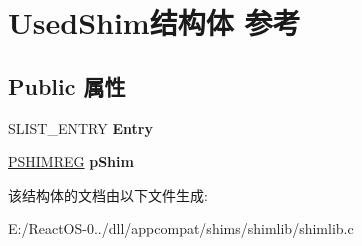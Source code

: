 \hypertarget{struct_used_shim}{}\section{Used\+Shim结构体 参考}
\label{struct_used_shim}
\subsection*{Public 属性}
\begin{DoxyCompactItemize}
\item 
\mbox{\label{struct_used_shim_a218ec9012872b8647698716df26bdc23}} 
S\+L\+I\+S\+T\+\_\+\+E\+N\+T\+RY {\bfseries Entry}
\item 
\mbox{\label{struct_used_shim_a3b9c7eb2bc402999be00522f0f04453c}} 
\hyperlink{structtag_s_h_i_m_r_e_g}{P\+S\+H\+I\+M\+R\+EG} {\bfseries p\+Shim}
\end{DoxyCompactItemize}


该结构体的文档由以下文件生成\+:\begin{DoxyCompactItemize}
\item 
E\+:/\+React\+O\+S-\/0../dll/appcompat/shims/shimlib/shimlib.\+c\end{DoxyCompactItemize}
